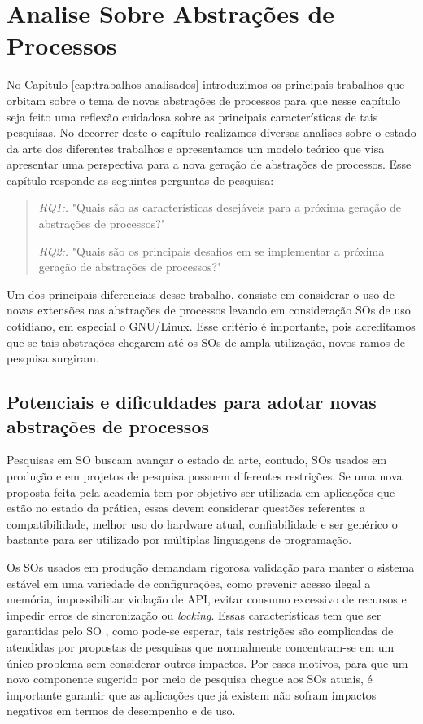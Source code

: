 \chapter{Analise Sobre Abstrações de Processos}
\label{cap:analise-sobre-abstracoes-de-processos}

No Capítulo \ref{cap:trabalhos-analisados} introduzimos os principais trabalhos
que orbitam sobre o tema de novas abstrações de processos para que nesse
capítulo seja feito uma reflexão cuidadosa sobre as principais características
de tais pesquisas. No decorrer deste o capítulo realizamos diversas analises
sobre o estado da arte dos diferentes trabalhos e apresentamos um modelo
teórico que visa apresentar uma perspectiva para a nova geração de abstrações
de processos.  Esse capítulo responde as seguintes perguntas de pesquisa:

\begin{quote}
 \item \textit{RQ1:.} "Quais são as características desejáveis para a próxima geração de abstrações de processos?"
 \item \textit{RQ2:.} "Quais são os principais desafios em se implementar a próxima geração de abstrações de processos?"
\end{quote}

Um dos principais diferenciais desse trabalho, consiste em considerar o uso de
novas extensões nas abstrações de processos levando em consideração SOs de uso
cotidiano, em especial o GNU/Linux. Esse critério é importante, pois
acreditamos que se tais abstrações chegarem até os SOs de ampla utilização,
novos ramos de pesquisa surgiram.

\section{Potenciais e dificuldades para adotar novas abstrações de processos}
\label{sec:potenciais}

Pesquisas em SO buscam avançar o estado da arte, contudo, SOs
usados em produção e em projetos de pesquisa possuem diferentes restrições. Se uma
nova proposta feita pela academia tem por objetivo ser utilizada em aplicações
que estão no estado da prática, essas devem considerar questões referentes
a compatibilidade, melhor uso do hardware atual, confiabilidade e ser genérico
o bastante para ser utilizado por múltiplas linguagens de programação.

Os SOs usados em produção demandam rigorosa validação para manter o sistema
estável em uma variedade de configurações, como prevenir acesso ilegal a
memória, impossibilitar violação de API, evitar consumo excessivo de recursos e
impedir erros de sincronização ou \textit{locking}. Essas características tem
que ser garantidas pelo SO \citep{mondrix}, como pode-se esperar, tais
restrições são complicadas de atendidas por propostas de pesquisas que
normalmente concentram-se em um único problema sem considerar outros impactos.
Por esses motivos, para que um novo componente sugerido por meio de pesquisa
chegue aos SOs atuais, é importante garantir que as aplicações que já existem
não sofram impactos negativos em termos de desempenho e de uso.

